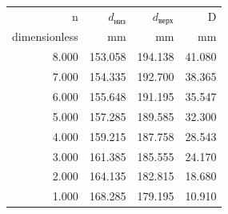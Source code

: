 \begin{table}[H]
    \centering
    \begin{tabular}{rrrr}
        \toprule
        n             & $d_\text{низ}$      & $d_\text{верх}$     & D                   \\
        dimensionless & \si[]{\milli\meter} & \si[]{\milli\meter} & \si[]{\milli\meter} \\
        \midrule
        8.000         & 153.058             & 194.138             & 41.080              \\
        7.000         & 154.335             & 192.700             & 38.365              \\
        6.000         & 155.648             & 191.195             & 35.547              \\
        5.000         & 157.285             & 189.585             & 32.300              \\
        4.000         & 159.215             & 187.758             & 28.543              \\
        3.000         & 161.385             & 185.555             & 24.170              \\
        2.000         & 164.135             & 182.815             & 18.680              \\
        1.000         & 168.285             & 179.195             & 10.910              \\
        \bottomrule
    \end{tabular}
\end{table}
